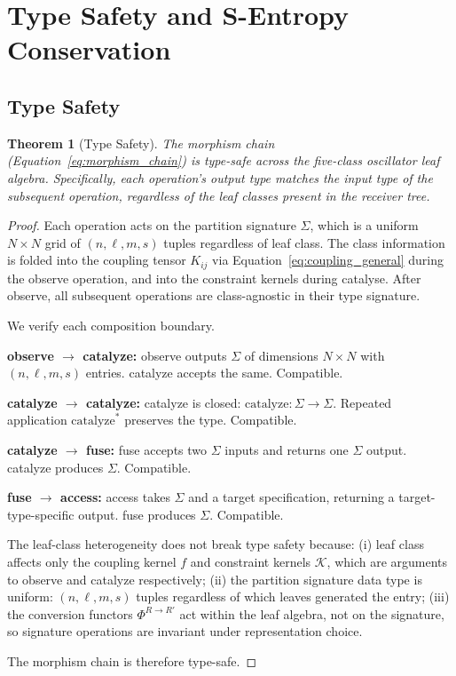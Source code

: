 \documentclass[11pt,twocolumn,a4paper]{article}
\newtheorem{theorem}{Theorem}[section]
\theoremstyle{definition}
\theoremstyle{remark}
\newcommand{\catalyst}{\mathcal{K}}
\newcommand{\Sig}{\Sigma}
\begin{document}
\section{Type Safety and S-Entropy Conservation}
\label{sec:type_safety}

\subsection{Type Safety}

\begin{theorem}[Type Safety]
\label{thm:type_safety}
The morphism chain (Equation~\eqref{eq:morphism_chain}) is type-safe across the five-class oscillator leaf algebra. Specifically, each operation's output type matches the input type of the subsequent operation, regardless of the leaf classes present in the receiver tree.
\end{theorem}

\begin{proof}
Each operation acts on the partition signature $\Sig$, which is a uniform $N \times N$ grid of $(n, \ell, m, s)$ tuples regardless of leaf class. The class information is folded into the coupling tensor $K_{ij}$ via Equation~\eqref{eq:coupling_general} during the observe operation, and into the constraint kernels during catalyse. After observe, all subsequent operations are class-agnostic in their type signature.

We verify each composition boundary.

\textbf{observe $\to$ catalyze:} observe outputs $\Sig$ of dimensions $N \times N$ with $(n, \ell, m, s)$ entries. catalyze accepts the same. Compatible.

\textbf{catalyze $\to$ catalyze:} catalyze is closed: $\mathrm{catalyze}: \Sig \to \Sig$. Repeated application $\mathrm{catalyze}^*$ preserves the type. Compatible.

\textbf{catalyze $\to$ fuse:} fuse accepts two $\Sig$ inputs and returns one $\Sig$ output. catalyze produces $\Sig$. Compatible.

\textbf{fuse $\to$ access:} access takes $\Sig$ and a target specification, returning a target-type-specific output. fuse produces $\Sig$. Compatible.

The leaf-class heterogeneity does not break type safety because:
(i) leaf class affects only the coupling kernel $f$ and constraint kernels $\catalyst$, which are arguments to observe and catalyze respectively;
(ii) the partition signature data type is uniform: $(n, \ell, m, s)$ tuples regardless of which leaves generated the entry;
(iii) the conversion functors $\Phi^{R \to R'}$ act within the leaf algebra, not on the signature, so signature operations are invariant under representation choice.

The morphism chain is therefore type-safe.
\end{proof}
\end{document}

